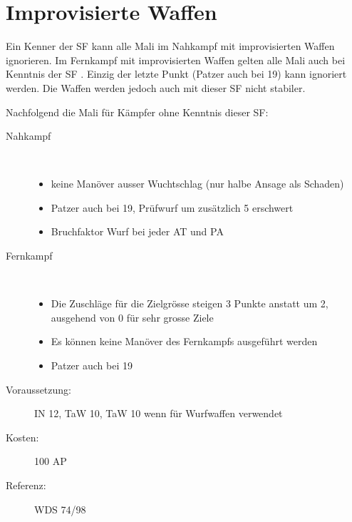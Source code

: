 \section{Improvisierte Waffen}
\label{sf.improvisierte_waffen}
Ein Kenner der SF  kann alle Mali im Nahkampf mit improvisierten Waffen ignorieren.
Im Fernkampf mit improvisierten Waffen gelten alle Mali auch bei Kenntnis der SF .
Einzig der letzte Punkt (Patzer auch bei 19) kann ignoriert werden.
Die Waffen werden jedoch auch mit dieser SF nicht stabiler.

Nachfolgend die Mali für Kämpfer ohne Kenntnis dieser SF:

\begin{description}
    \item[Nahkampf] \hfill \\
        \begin{itemize}
            \item keine Manöver ausser Wuchtschlag (nur halbe Ansage als Schaden)
            \item Patzer auch bei 19, Prüfwurf um zusätzlich 5 erschwert
            \item Bruchfaktor Wurf bei jeder AT und PA
        \end{itemize}
    \item[Fernkampf] \hfill \\
        \begin{itemize}
            \item Die Zuschläge für die Zielgrösse steigen 3 Punkte anstatt um 2, ausgehend von 0 für sehr grosse Ziele
            \item Es können keine Manöver des Fernkampfs ausgeführt werden
            \item Patzer auch bei 19
        \end{itemize}
\end{description}

\begin{description}
    \item[Voraussetzung:]
        IN 12, TaW  10, TaW  10 wenn für Wurfwaffen verwendet
    \item [Kosten:]
        100 AP
    \item [Referenz:]
        WDS 74/98
\end{description}
